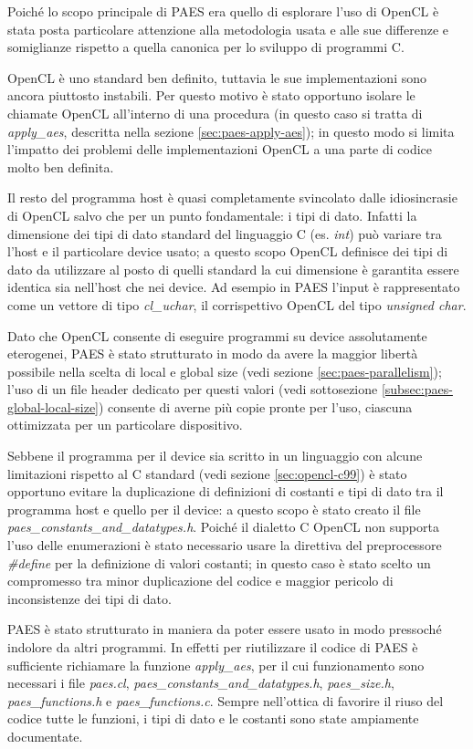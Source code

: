 \documentclass[12pt,a4paper,oneside]{book}
\begin{document}
Poiché lo scopo principale di PAES era quello di esplorare l'uso di \ac{OpenCL} è stata posta particolare attenzione alla metodologia usata e alle sue differenze e somiglianze rispetto a quella canonica per lo sviluppo di programmi C.

\ac{OpenCL} è uno standard ben definito, tuttavia le sue implementazioni sono ancora piuttosto instabili. Per questo motivo è stato opportuno isolare le chiamate \ac{OpenCL} all'interno di una procedura (in questo caso si tratta di \textit{apply\_aes}, descritta nella sezione \ref{sec:paes-apply-aes}); in questo modo si limita l'impatto dei problemi delle implementazioni \ac{OpenCL} a una parte di codice molto ben definita.

Il resto del programma host è quasi completamente svincolato dalle idiosincrasie di \ac{OpenCL} salvo che per un punto fondamentale: i tipi di dato. Infatti la dimensione dei tipi di dato standard del linguaggio C (es. \textit{int}) può variare tra l'host e il particolare device usato; a questo scopo \ac{OpenCL} definisce dei tipi di dato da utilizzare al posto di quelli standard la cui dimensione è garantita essere identica sia nell'host che nei device. Ad esempio in PAES l'input è rappresentato come un vettore di tipo \textit{cl\_uchar}, il corrispettivo \ac{OpenCL} del tipo \textit{unsigned char}.

Dato che \ac{OpenCL} consente di eseguire programmi su device assolutamente eterogenei, PAES è stato strutturato in modo da avere la maggior libertà possibile nella scelta di local e global size (vedi sezione \ref{sec:paes-parallelism}); l'uso di un file header dedicato per questi valori (vedi sottosezione \ref{subsec:paes-global-local-size}) consente di averne più copie pronte per l'uso, ciascuna ottimizzata per un particolare dispositivo.

Sebbene il programma per il device sia scritto in un linguaggio con alcune limitazioni rispetto al C standard (vedi sezione \ref{sec:opencl-c99}) è stato opportuno evitare la duplicazione di definizioni di costanti e tipi di dato tra il programma host e quello per il device: a questo scopo è stato creato il file \textit{paes\_constants\_and\_datatypes.h}. Poiché il dialetto C \ac{OpenCL} non supporta l'uso delle enumerazioni è stato necessario usare la direttiva del preprocessore \textit{\#define} per la definizione di valori costanti; in questo caso è stato scelto un compromesso tra minor duplicazione del codice e maggior pericolo di inconsistenze dei tipi di dato.

PAES è stato strutturato in maniera da poter essere usato in modo pressoché indolore da altri programmi. In effetti per riutilizzare il codice di PAES è sufficiente richiamare la funzione \textit{apply\_aes}, per il cui funzionamento sono necessari i file \textit{paes.cl}, \textit{paes\_constants\_and\_datatypes.h}, \textit{paes\_size.h}, \textit{paes\_functions.h} e \textit{paes\_functions.c}. Sempre nell'ottica di favorire il riuso del codice tutte le funzioni, i tipi di dato e le costanti sono state ampiamente documentate.
\end{document}
